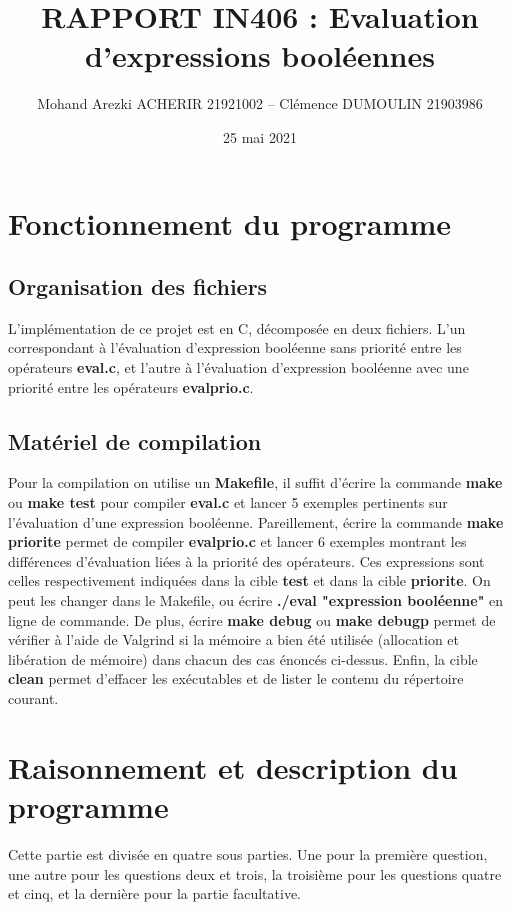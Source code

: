 \documentclass[11pt]{article}
\begin{document}
\title{RAPPORT IN406 : Evaluation d'expressions booléennes}
\author{Mohand Arezki ACHERIR 21921002 -- Clémence DUMOULIN 21903986}
\date{25 mai 2021}
\maketitle

\renewcommand*\contentsname{Sommaire}
\tableofcontents

\newpage
\section{Fonctionnement du programme}
\subsection{Organisation des fichiers}
L'implémentation de ce projet est en C, décomposée en deux fichiers. L'un correspondant à l'évaluation d'expression booléenne sans priorité entre les opérateurs \textbf{eval.c}, et l'autre à l'évaluation d'expression booléenne avec une priorité entre les opérateurs \textbf{evalprio.c}.

\subsection{Matériel de compilation}
\noindent Pour la compilation on utilise un \textbf{Makefile}, il suffit d'écrire la commande \textbf{make} ou \textbf{make test} pour compiler \textbf{eval.c} et lancer 5 exemples pertinents sur l'évaluation d'une expression booléenne. Pareillement, écrire la commande \textbf{make priorite} permet de compiler \textbf{evalprio.c} et lancer 6 exemples montrant les différences d'évaluation liées à la priorité des opérateurs. Ces expressions sont celles respectivement indiquées dans la cible \textbf{test} et dans la cible \textbf{priorite}. On peut les changer dans le Makefile, ou écrire \textbf{./eval "expression booléenne"} en ligne de commande. De plus, écrire \textbf{make debug} ou \textbf{make debugp} permet de vérifier à l'aide de Valgrind si la mémoire a bien été utilisée (allocation et libération de mémoire) dans chacun des cas énoncés ci-dessus. Enfin, la cible \textbf{clean} permet d'effacer les exécutables et de lister le contenu du répertoire courant.
\bigskip

\section{Raisonnement et description du programme}
Cette partie est divisée en quatre sous parties. Une pour la première question, une autre pour les questions deux et trois, la troisième pour les questions quatre et cinq, et la dernière pour la partie facultative.
\end{document}
